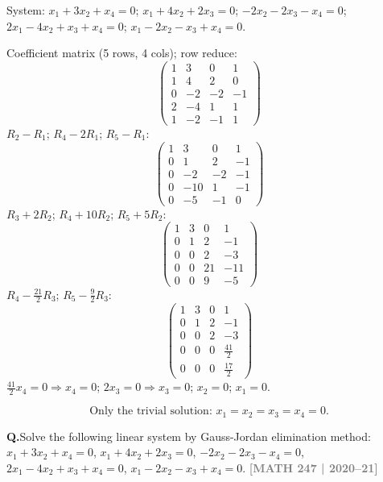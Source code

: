 \documentclass[12pt,a3paper]{article}
\newcommand{\yr}[1]{\hfill\textcolor{gray}{\small\textbf{[#1]}}}
\newcounter{qnum}
\newcommand{\Q}[1]{%
  \needspace{4\baselineskip}
  \refstepcounter{qnum}
  \vspace{6pt}
  \noindent\textbf{Q\theqnum.}\enspace #1\par
}
\begin{document}
\begin{tcolorbox}[enhanced,breakable,
  colback=cB!4,colframe=cB,boxrule=0.8pt,arc=5pt,
  title={\textbf{Answer --- Homogeneous System: 5 Equations in 4 Variables}},
  fonttitle=\bfseries\color{white},colbacktitle=cB]

System: $x_1+3x_2+x_4=0$;\; $x_1+4x_2+2x_3=0$;\; $-2x_2-2x_3-x_4=0$;\; $2x_1-4x_2+x_3+x_4=0$;\; $x_1-2x_2-x_3+x_4=0$.

Coefficient matrix (5 rows, 4 cols); row reduce:
\[
\begin{pmatrix}1&3&0&1\\1&4&2&0\\0&-2&-2&-1\\2&-4&1&1\\1&-2&-1&1\end{pmatrix}
\]
$R_2-R_1$; $R_4-2R_1$; $R_5-R_1$:
\[
\begin{pmatrix}1&3&0&1\\0&1&2&-1\\0&-2&-2&-1\\0&-10&1&-1\\0&-5&-1&0\end{pmatrix}
\]
$R_3+2R_2$; $R_4+10R_2$; $R_5+5R_2$:
\[
\begin{pmatrix}1&3&0&1\\0&1&2&-1\\0&0&2&-3\\0&0&21&-11\\0&0&9&-5\end{pmatrix}
\]
$R_4-\frac{21}{2}R_3$; $R_5-\frac{9}{2}R_3$:
\[
\begin{pmatrix}1&3&0&1\\0&1&2&-1\\0&0&2&-3\\0&0&0&\frac{41}{2}\\0&0&0&\frac{17}{2}\end{pmatrix}
\]
$\frac{41}{2}x_4=0\Rightarrow x_4=0$; $2x_3=0\Rightarrow x_3=0$; $x_2=0$; $x_1=0$.

\[
\boxed{\text{Only the trivial solution: } x_1=x_2=x_3=x_4=0.}
\]

\end{tcolorbox}

\Q{Solve the following linear system by Gauss-Jordan elimination method:
$x_1 + 3x_2 + x_4 = 0$, $x_1 + 4x_2 + 2x_3 = 0$, $-2x_2 - 2x_3 - x_4 = 0$, $2x_1 - 4x_2 + x_3 + x_4 = 0$, $x_1 - 2x_2 - x_3 + x_4 = 0$.
\yr{MATH 247 | 2020--21}}
\end{document}

